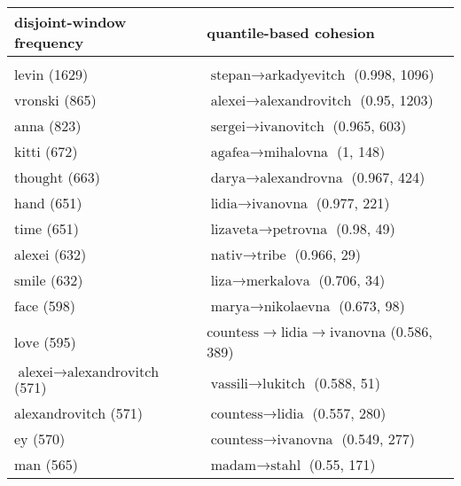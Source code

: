 \begin{table}
\centering

\begin{tabulary}{\textwidth}{L|L}

disjoint-window frequency & quantile-based cohesion \\
\hline \\
$ \text{levin} $ (1629) & $ \text{stepan} \to \text{arkadyevitch} $ (0.998, 1096) \\
$ \text{vronski} $ (865) & $ \text{alexei} \to \text{alexandrovitch} $ (0.95, 1203) \\
$ \text{anna} $ (823) & $ \text{sergei} \to \text{ivanovitch} $ (0.965, 603) \\
$ \text{kitti} $ (672) & $ \text{agafea} \to \text{mihalovna} $ (1, 148) \\
$ \text{thought} $ (663) & $ \text{darya} \to \text{alexandrovna} $ (0.967, 424) \\
$ \text{hand} $ (651) & $ \text{lidia} \to \text{ivanovna} $ (0.977, 221) \\
$ \text{time} $ (651) & $ \text{lizaveta} \to \text{petrovna} $ (0.98, 49) \\
$ \text{alexei} $ (632) & $ \text{nativ} \to \text{tribe} $ (0.966, 29) \\
$ \text{smile} $ (632) & $ \text{liza} \to \text{merkalova} $ (0.706, 34) \\
$ \text{face} $ (598) & $ \text{marya} \to \text{nikolaevna} $ (0.673, 98) \\
$ \text{love} $ (595) & $ \text{countess} \to \text{lidia} \to \text{ivanovna} $ (0.586, 389) \\
$ \text{alexei} \to \text{alexandrovitch} $ (571) & $ \text{vassili} \to \text{lukitch} $ (0.588, 51) \\
$ \text{alexandrovitch} $ (571) & $ \text{countess} \to \text{lidia} $ (0.557, 280) \\
$ \text{ey} $ (570) & $ \text{countess} \to \text{ivanovna} $ (0.549, 277) \\
$ \text{man} $ (565) & $ \text{madam} \to \text{stahl} $ (0.55, 171) \\

\end{tabulary}

\end{table}
